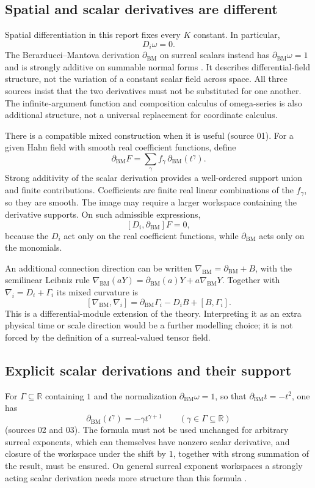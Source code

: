 \documentclass[11pt,letterpaper]{article}
\theoremstyle{definition}
\theoremstyle{remark}
\newcommand{\R}{\mathbb R}\newcommand{\C}{\mathbb C}
\newcommand{\BM}{\partial_{\mathrm{BM}}}
\begin{document}
\subsection{Spatial and scalar derivatives are different}

Spatial differentiation in this report fixes every $K$ constant. In
particular,
\[
 D_i\omega=0.
\]
The Berarducci--Mantova derivation $\BM$ on surreal scalars instead has
$\BM\omega=1$ and is strongly additive on summable normal forms \cite{BM}. It
describes differential-field structure, not the variation of a constant scalar
field across space. All three sources insist that the two derivatives must not
be substituted for one another. The infinite-argument function and composition
calculus of omega-series \cite{BMGerms,Mantova26} is also additional structure,
not a universal replacement for coordinate calculus.

There is a compatible mixed construction when it is useful (source 01). For a
given Hahn field with smooth real coefficient functions, define
\[
 \BM F=\sum_\gamma f_\gamma\,\BM(t^\gamma).
\]
Strong additivity of the scalar derivation provides a well-ordered support
union and finite contributions. Coefficients are finite real linear
combinations of the $f_\gamma$, so they are smooth. The image may require a
larger workspace containing the derivative supports. On such admissible
expressions,
\[
 [D_i,\BM]F=0,
\]
because the $D_i$ act only on the real coefficient functions, while $\BM$ acts
only on the monomials.

An additional connection direction can be written $\nabla_{\mathrm{BM}}=\BM+B$,
with the semilinear Leibniz rule
$\nabla_{\mathrm{BM}}(aY)=\BM(a)Y+a\nabla_{\mathrm{BM}}Y$. Together with
$\nabla_i=D_i+\Gamma_i$ its mixed curvature is
\[
 [\nabla_{\mathrm{BM}},\nabla_i]
 =\BM\Gamma_i-D_iB+[B,\Gamma_i].
\]
This is a differential-module extension of the theory. Interpreting it as an
extra physical time or scale direction would be a further modelling choice; it
is not forced by the definition of a surreal-valued tensor field.

\subsection{Explicit scalar derivations and their support}

For $\Gamma\subseteq\R$ containing $1$ and the normalization $\BM\omega=1$, so
that $\BM t=-t^2$, one has
\[
 \BM(t^\gamma)=-\gamma t^{\gamma+1}\qquad(\gamma\in\Gamma\subseteq\R)
\]
(sources 02 and 03). The formula must not be used unchanged for arbitrary
surreal exponents, which can themselves have nonzero scalar derivative, and
closure of the workspace under the shift by $1$, together with strong summation
of the result, must be ensured. On general surreal exponent workspaces a
strongly acting scalar derivation needs more structure than this formula
\cite{BM,MM}.
\end{document}
